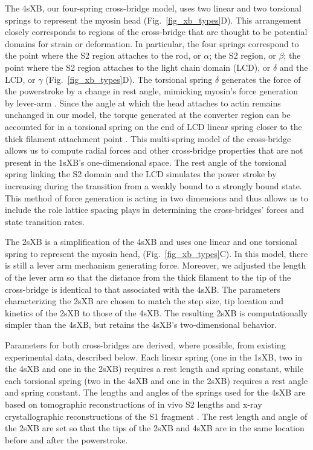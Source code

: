 \documentclass[]{article}
\begin{document}
The 4sXB, our four-spring cross-bridge model, uses two linear and two torsional springs to represent the myosin head (Fig.~\ref{fig_xb_types}D).
This arrangement closely corresponds to regions of the cross-bridge that are thought to be potential domains for strain or deformation. 
In particular, the four springs correspond to the point where the S2 region attaches to the rod, or $\alpha$; the S2 region, or $\beta$; the point where the S2 region attaches to the light chain domain (LCD), or $\delta$ and the LCD, or $\gamma$ (Fig.~\ref{fig_xb_types}D). 
The torsional spring $\delta$ generates the force of the powerstroke by a change in rest angle, mimicking myosin's force generation by lever-arm \citep{Houdusse2000, Houdusse2001}. %
Since the angle at which the head attaches to actin remains unchanged in our model, the torque generated at the converter region can be accounted for in a torsional spring on the end of LCD linear spring closer to the thick filament attachment point \citep{Lauzon2001}. %
This multi-spring model of the cross-bridge allows us to compute radial forces and other cross-bridge properties that are not present in the 1sXB's one-dimensional space. 
The rest angle of the torsional spring linking the S2 domain and the LCD simulates the power stroke by increasing during the transition from a weakly bound to a strongly bound state.
This method of force generation is acting in two dimensions and thus allows us to include the role lattice spacing plays in determining the cross-bridges' forces and state transition rates.

The 2sXB is a simplification of the 4sXB and uses one linear and one torsional spring to represent the myosin head, (Fig.~\ref{fig_xb_types}C).
In this model, there is still a lever arm mechanism generating force.  
Moreover, we adjusted the length of the lever arm so that the distance from the thick filament to the tip of the cross-bridge is identical to that associated with the 4sXB.
The parameters characterizing the 2sXB are chosen to match the step size, tip location and kinetics of the 2sXB to those of the 4sXB. 
The resulting 2sXB is computationally simpler than the 4sXB, but retains the 4sXB's two-dimensional behavior.

Parameters for both cross-bridges are derived, where possible, from existing experimental data, described below.  
Each linear spring (one in the 1sXB, two in the 4sXB and one in the 2sXB) requires a rest length and spring constant, while each torsional spring (two in the 4sXB and one in the 2sXB) requires a rest angle and spring constant.
The lengths and angles of the springs used for the 4sXB are based on tomographic reconstructions of in vivo S2 lengths and x-ray crystallographic reconstructions of the S1 fragment \citep{Taylor1999, Rayment1993}.
The rest length and angle of the 2sXB are set so that the tips of the 2sXB and 4sXB are in the same location before and after the powerstroke.
\end{document}
